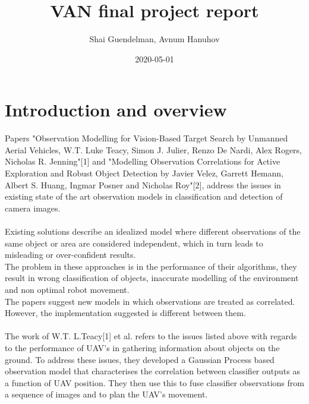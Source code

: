 \documentclass{article}
\title{VAN final project report}
\date{2020-05-01}
\author{Shai Guendelman, Avnum Hanuhov}
\begin{document}
	\maketitle
	\newpage
	
	\section{Introduction and overview}
	Papers "Observation Modelling for Vision-Based Target Search by Unmanned Aerial Vehicles, W.T. Luke Teacy, Simon J. Julier, Renzo De Nardi, Alex Rogers, Nicholas R. Jenning"[1] and "Modelling Observation Correlations for Active Exploration and Robust Object Detection by Javier Velez, Garrett Hemann, Albert S. Huang, Ingmar Posner and Nicholas Roy"[2], address the issues in existing state of the art observation models in classification and detection of camera images. \\ \\
	Existing solutions describe an idealized model where different observations of the same object or area are considered independent, which in turn leads to misleading or over-confident results. \\
	The problem in these approaches is in the performance of their algorithms, they result in wrong classification of objects, inaccurate modelling of the environment and non optimal robot movement. \\
	The papers suggest new models in which observations are treated as correlated. However, the implementation suggested is different between them. \\ \\
	The work of W.T. L.Teacy[1] et al. refers to the issues listed above with regards to the performance of UAV's in gathering information about objects on the ground. To address these issues, they developed a Gaussian Process based observation model that characterises the correlation between classifier outputs as a function of UAV position. They then use this to fuse classifier observations from a sequence of images and to plan the UAV's movement. \\
\end{document}
